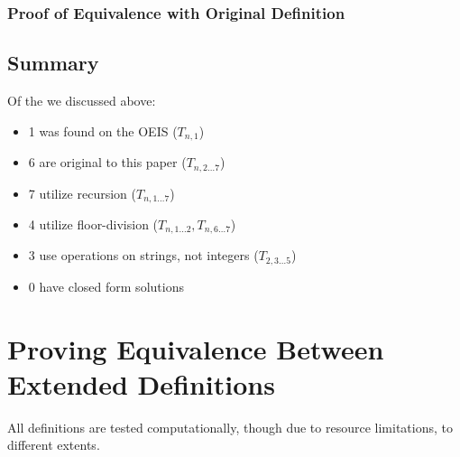 \documentclass[conference]{IEEEtran}
\begin{document}

\subsubsection{Proof of Equivalence with Original Definition }

\subsection{Summary}

Of the \TotalExtensions we discussed above:
\begin{itemize}
    \item 1 was found on the OEIS ($T_{n,1}$)
    \item 6 are original to this paper ($T_{n,2\dots7}$)
    \\%
    \item 7 utilize recursion ($T_{n,1\dots7}$)
    \item 4 utilize floor-division ($T_{n,1\dots2}, T_{n,6\dots7}$)
    \item 3 use operations on strings, not integers ($T_{2,3\dots5}$)
    \item 0 have closed form solutions
\end{itemize}

\section{Proving Equivalence Between Extended Definitions}

All definitions are tested computationally, though due to resource limitations, to different extents.
\end{document}

